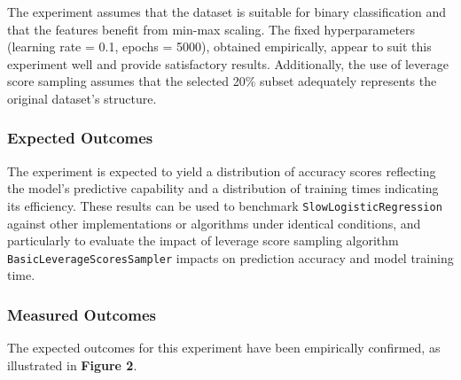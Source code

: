 \documentclass{article}
\theoremstyle{plain}
\theoremstyle{definition}
\theoremstyle{remark}
\begin{document}
The experiment assumes that the dataset is suitable for binary classification and that the features benefit from min-max scaling. The fixed hyperparameters (learning rate = 0.1, epochs = 5000), obtained empirically, appear to suit this experiment well and provide satisfactory results. Additionally, the use of leverage score sampling assumes that the selected 20\% subset adequately represents the original dataset's structure.

\subsubsection{Expected Outcomes}

The experiment is expected to yield a distribution of accuracy scores reflecting the model's predictive capability and a distribution of training times indicating its efficiency. These results can be used to benchmark \texttt{SlowLogisticRegression} against other implementations or algorithms under identical conditions, and particularly to evaluate the impact of leverage score sampling algorithm \texttt{BasicLeverageScoresSampler} impacts on prediction accuracy and model training time.

\subsubsection{Measured Outcomes}

The expected outcomes for this experiment have been empirically confirmed, as illustrated in \textbf{Figure 2}.
\end{document}
